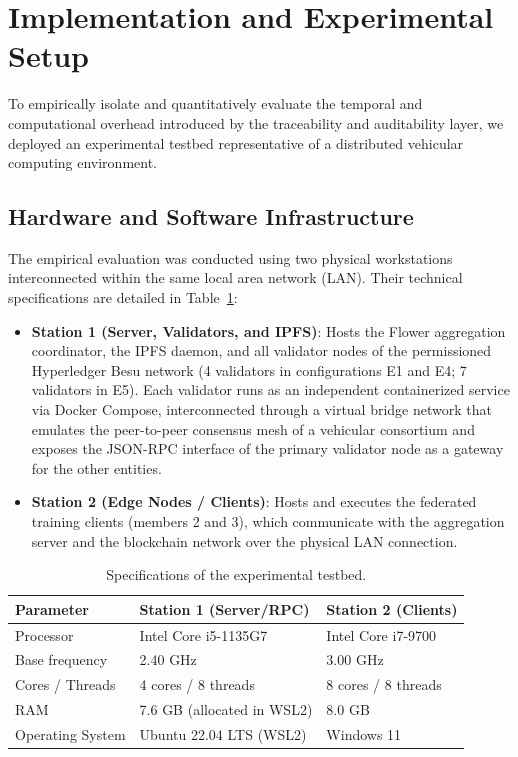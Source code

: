 \section{Implementation and Experimental Setup}
\label{sec:implementacion}

To empirically isolate and quantitatively evaluate the temporal and computational overhead introduced by the traceability and auditability layer, we deployed an experimental testbed representative of a distributed vehicular computing environment.

\subsection{Hardware and Software Infrastructure}
The empirical evaluation was conducted using two physical workstations interconnected within the same local area network (LAN). Their technical specifications are detailed in Table~\ref{tab:testbed_hardware}:
\begin{itemize}
    \item \textbf{Station 1 (Server, Validators, and IPFS)}: Hosts the Flower aggregation coordinator, the IPFS daemon, and all validator nodes of the permissioned Hyperledger Besu network (4 validators in configurations E1 and E4; 7 validators in E5). Each validator runs as an independent containerized service via Docker Compose, interconnected through a virtual bridge network that emulates the peer-to-peer consensus mesh of a vehicular consortium and exposes the JSON-RPC interface of the primary validator node as a gateway for the other entities.
    \item \textbf{Station 2 (Edge Nodes / Clients)}: Hosts and executes the federated training clients (members 2 and 3), which communicate with the aggregation server and the blockchain network over the physical LAN connection.
\end{itemize}

\begin{table}[htbp]
\caption{Specifications of the experimental testbed.}\label{tab:testbed_hardware}
\begin{tabular*}{\textwidth}{@{\extracolsep\fill}lll}
\toprule
\textbf{Parameter} & \textbf{Station 1 (Server/RPC)} & \textbf{Station 2 (Clients)} \\
\midrule
Processor & Intel Core i5-1135G7 & Intel Core i7-9700 \\
Base frequency & 2.40 GHz & 3.00 GHz \\
Cores / Threads & 4 cores / 8 threads & 8 cores / 8 threads \\
RAM & 7.6 GB (allocated in WSL2) & 8.0 GB \\
Operating System & Ubuntu 22.04 LTS (WSL2) & Windows 11 \\
\bottomrule
\end{tabular*}
\end{table}

